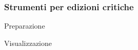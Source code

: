 %
%
%
%
%
%
%
%
%




\begin{frame}
	\frametitle{Strumenti per edizioni critiche}
	\addtocounter{nframe}{1}
    \begin{block}{Preparazione}
	\end{block}
	\begin{block}{Visualizzazione}
	\end{block}
\end{frame}


